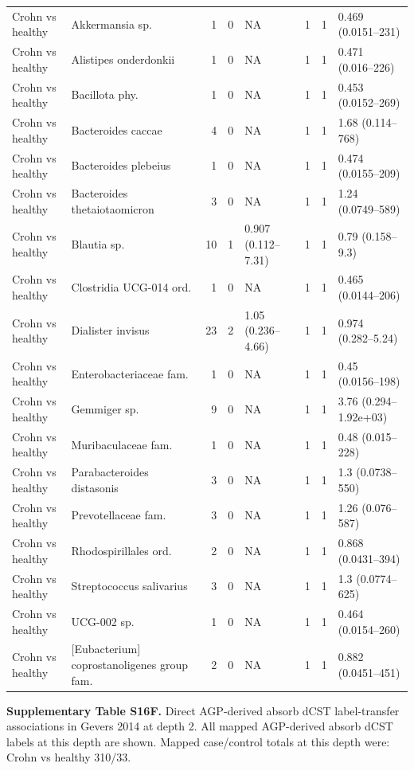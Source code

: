 \begin{longtable}{@{} p{} p{} r r p{} p{} p{} p{} @{}}
Crohn vs healthy & Akkermansia sp. & 1 & 0 & NA & 1 & 1 & 0.469 (0.0151--231) \\
Crohn vs healthy & Alistipes onderdonkii & 1 & 0 & NA & 1 & 1 & 0.471 (0.016--226) \\
Crohn vs healthy & Bacillota phy. & 1 & 0 & NA & 1 & 1 & 0.453 (0.0152--269) \\
Crohn vs healthy & Bacteroides caccae & 4 & 0 & NA & 1 & 1 & 1.68 (0.114--768) \\
Crohn vs healthy & Bacteroides plebeius & 1 & 0 & NA & 1 & 1 & 0.474 (0.0155--209) \\
Crohn vs healthy & Bacteroides thetaiotaomicron & 3 & 0 & NA & 1 & 1 & 1.24 (0.0749--589) \\
Crohn vs healthy & Blautia sp. & 10 & 1 & 0.907 (0.112--7.31) & 1 & 1 & 0.79 (0.158--9.3) \\
Crohn vs healthy & Clostridia UCG-014 ord. & 1 & 0 & NA & 1 & 1 & 0.465 (0.0144--206) \\
Crohn vs healthy & Dialister invisus & 23 & 2 & 1.05 (0.236--4.66) & 1 & 1 & 0.974 (0.282--5.24) \\
Crohn vs healthy & Enterobacteriaceae fam. & 1 & 0 & NA & 1 & 1 & 0.45 (0.0156--198) \\
Crohn vs healthy & Gemmiger sp. & 9 & 0 & NA & 1 & 1 & 3.76 (0.294--1.92e+03) \\
Crohn vs healthy & Muribaculaceae fam. & 1 & 0 & NA & 1 & 1 & 0.48 (0.015--228) \\
Crohn vs healthy & Parabacteroides distasonis & 3 & 0 & NA & 1 & 1 & 1.3 (0.0738--550) \\
Crohn vs healthy & Prevotellaceae fam. & 3 & 0 & NA & 1 & 1 & 1.26 (0.076--587) \\
Crohn vs healthy & Rhodospirillales ord. & 2 & 0 & NA & 1 & 1 & 0.868 (0.0431--394) \\
Crohn vs healthy & Streptococcus salivarius & 3 & 0 & NA & 1 & 1 & 1.3 (0.0774--625) \\
Crohn vs healthy & UCG-002 sp. & 1 & 0 & NA & 1 & 1 & 0.464 (0.0154--260) \\
Crohn vs healthy & [Eubacterium] coprostanoligenes group fam. & 2 & 0 & NA & 1 & 1 & 0.882 (0.0451--451) \\
\end{longtable}
\endgroup
\bigskip

\noindent\textbf{Supplementary Table S16F.} Direct AGP-derived absorb dCST label-transfer associations in Gevers 2014 at depth 2. All mapped AGP-derived absorb dCST labels at this depth are shown. Mapped case/control totals at this depth were: Crohn vs healthy 310/33.

